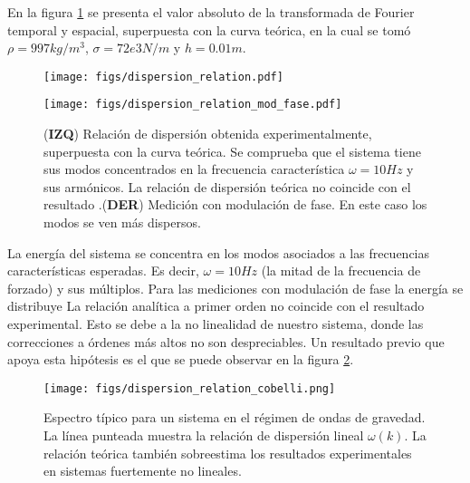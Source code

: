 \documentclass[../main.tex]{subfiles}
\begin{document}
En la figura \ref{fig:relacion_de_dispersion} se presenta el valor absoluto de la transformada de Fourier temporal y espacial, superpuesta con la curva teórica, en la cual se tomó $\rho = 997 \si{kg/m^3} $, $\sigma = 72e3 \si{N/m}$ y $h = 0.01 \si{m}$. 

\begin{figure}[H]
	\centering
	\begin{minipage}{0.46\textwidth}
        \centering
        \texttt{[image: figs/dispersion\_relation.pdf]}
	\end{minipage} \hfill
	\begin{minipage}{0.46\textwidth}
	    \texttt{[image: figs/dispersion\_relation\_mod\_fase.pdf]}
	\end{minipage}
    \caption{(\textbf{IZQ}) Relación de dispersión obtenida experimentalmente, superpuesta con la curva teórica. Se comprueba que el sistema tiene sus modos concentrados en la frecuencia característica $\omega = 10 \si{Hz}$ y sus armónicos. La relación de dispersión teórica no coincide con el resultado .(\textbf{DER}) Medición con modulación de fase. En este caso los modos se ven más dispersos. }
    \label{fig:relacion_de_dispersion}
\end{figure}

La energía del sistema se concentra en los modos asociados a las frecuencias características esperadas. Es decir, $\omega = 10 \si{Hz}$ (la mitad de la frecuencia de forzado) y sus múltiplos. Para las mediciones con modulación de fase la energía se distribuye
La relación analítica a primer orden no coincide con el resultado experimental. Esto se debe a la no linealidad de nuestro sistema, donde las correcciones a órdenes más altos no son despreciables. Un resultado previo que apoya esta hipótesis es el que se puede observar en la figura \ref{fig:relacion_de_dispersion_cobelli}.

\begin{figure}[H]
	\centering
	\texttt{[image: figs/dispersion\_relation\_cobelli.png]}
    \caption{Espectro típico para un sistema en el régimen de ondas de gravedad. La línea punteada muestra la relación de dispersión lineal $\omega(k)$. La relación teórica también sobreestima los resultados experimentales en sistemas fuertemente no lineales. }
    \label{fig:relacion_de_dispersion_cobelli}
\end{figure}
\end{document}

